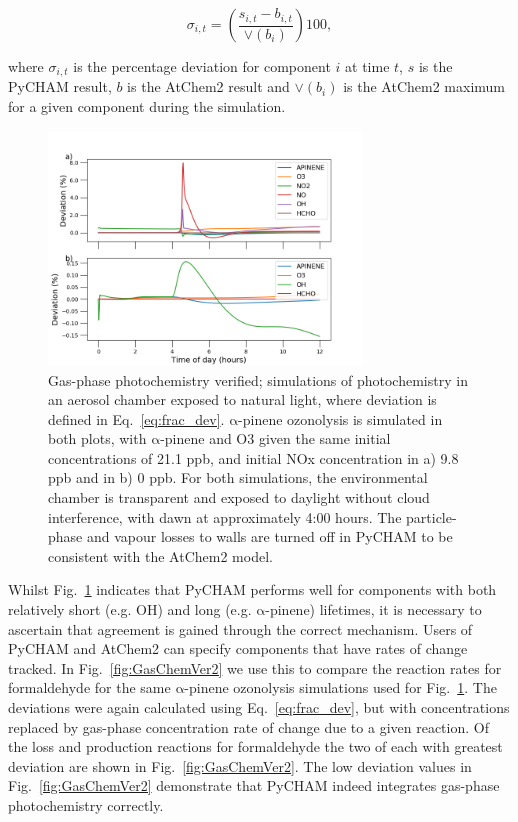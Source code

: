 \documentclass[gmd, manuscript]{copernicus}
\begin{document}
\begin{equation} \label{eq:frac_dev}
\sigma_{i,t} = \left(\frac{s_{i,t}-b_{i,t}}{\lor(b_{i})}\right)100\mathrm{,}
\end{equation}

where $\sigma_{i,t}$ is the percentage deviation for component $i$ at time $t$, $s$ is the PyCHAM result, $b$ is the AtChem2 result and $\lor(b_{i})$ is the AtChem2 maximum for a given component during the simulation.

\begin{figure}[t]
\includegraphics[width=8.3cm]{Results/photo_chem_conc_dev.png}
\caption{Gas-phase photochemistry verified; simulations of photochemistry in an aerosol chamber exposed to natural light, where deviation is defined in Eq.~\ref{eq:frac_dev}.  $\mathrm{\alpha}$-pinene ozonolysis is simulated in both plots, with $\mathrm{\alpha}$-pinene and O3 given the same initial concentrations of 21.1 ppb, and initial NOx concentration in a) 9.8 ppb and in b) 0 ppb.  For both simulations, the environmental chamber is transparent and exposed to daylight without cloud interference, with dawn at approximately 4:00 hours.  The particle-phase and vapour losses to walls are turned off in PyCHAM to be consistent with the AtChem2 model.}
\label{fig:GasChemVer1}
\end{figure}

Whilst Fig.~\ref{fig:GasChemVer1} indicates that PyCHAM performs well for components with both relatively short (e.g. OH) and long (e.g. $\mathrm{\alpha}$-pinene) lifetimes, it is necessary to ascertain that agreement is gained through the correct mechanism.  Users of PyCHAM and AtChem2 can specify components that have rates of change tracked.  In Fig.~\ref{fig:GasChemVer2} we use this to compare the reaction rates for formaldehyde for the same $\mathrm{\alpha}$-pinene ozonolysis simulations used for Fig.~\ref{fig:GasChemVer1}.  The deviations were again calculated using Eq.~\ref{eq:frac_dev}, but with concentrations replaced by gas-phase concentration rate of change due to a given reaction.  Of the loss and production reactions for formaldehyde the two of each with greatest deviation are shown in Fig.~\ref{fig:GasChemVer2}.  The low deviation values in Fig.~\ref{fig:GasChemVer2} demonstrate that PyCHAM indeed integrates gas-phase photochemistry correctly.
\end{document}
